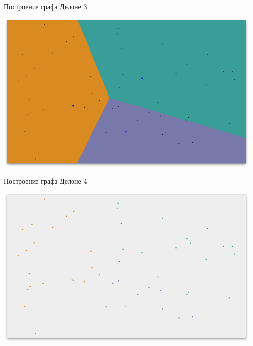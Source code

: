 \documentclass[14pt, fleqn, xcolor={dvipsnames, table}]{beamer}
\begin{document}
        \begin{frame}{Построение графа Делоне 3}
            \begin{center}
                \includegraphics[scale=0.295]{3.png}
            \end{center}             
        \end{frame}
        
        \begin{frame}{Построение графа Делоне 4}
            \begin{center}
                \includegraphics[scale=0.295]{4.png}
            \end{center}             
        \end{frame}
        
\end{document}
